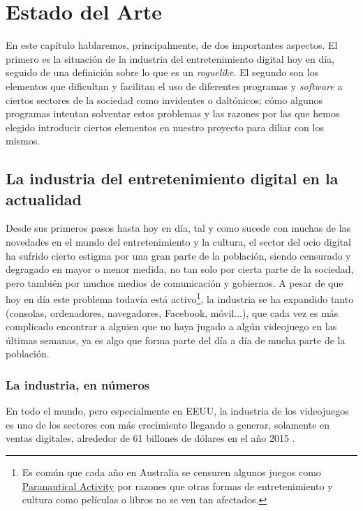 \chapter{Estado del Arte}

En este capítulo hablaremos, principalmente, de dos importantes aspectos. El primero es la situación de la industria del entretenimiento digital hoy en día, seguido de una definición sobre lo que es un \textit{roguelike}. El segundo son los elementos que dificultan y facilitan el uso de diferentes programas y \textit{software} a ciertos sectores de la sociedad como invidentes o daltónicos; cómo algunos programas intentan solventar estos problemas y las razones por las que hemos elegido introducir ciertos elementos en nuestro proyecto para diliar con los mismos.

\section{La industria del entretenimiento digital en la actualidad}

Desde sus primeros pasos hasta hoy en día, tal y como sucede con muchas de las novedades en el mundo del entretenimiento y la cultura, el sector del ocio digital ha sufrido cierto estigma por una gran parte de la población, siendo censurado y degragado en mayor o menor medida, no tan solo por cierta parte de la sociedad, pero también por muchos medios de comunicación y gobiernos. A pesar de que hoy en día este problema todavía está activo\footnote{Es común que cada año en Australia se censuren algunos juegos como \href{http://goo.gl/hFrQah}{Paranautical Activity} por razones que otras formas de entretenimiento y cultura como películas o libros no se ven tan afectados.}, la industria se ha expandido tanto (consolas, ordenadores, navegadores, Facebook, móvil...), que cada vez es más complicado encontrar a alguien que no haya jugado a algún videojuego en las últimas semanas, ya es algo que forma parte del día a día de mucha parte de la población.

\subsection{La industria, en números}
En todo el mundo, pero especialmente en EEUU, la industria de los videojuegos es uno de los sectores con más crecimiento \cite{website:gamesimprovingeconomy} llegando a generar, solamente en ventas digitales, alrededor de 61 billones de dólares en el año 2015 \cite{website:gamingsales}.

